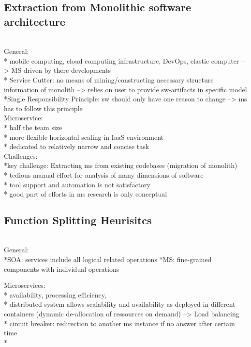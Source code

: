 \subsection{Extraction from Monolithic software architecture}
\cite{ExtractionMazlami} \\


General:\\
* mobile computing, cloud computing infrastructure, DevOps, elastic computer --> MS driven by there developments\\
* Service Cutter: no means of mining/constructing necessary structure information of monolith --> relies on user to provide sw-artifacts in specific model\\
*Single Responsibility Principle: sw should only have one reason to change --> ms has to follow this principle\\

Microservice:\\
* half the team size\\
* more flexible horizontal scaling in IaaS environment\\
* dedicated to relatively narrow and concise task\\


Challenges:\\
*key challenge: Extracting ms from existing codebases (migration of monolith)\\
* tedious manual effort for analysis of many dimensions of software\\
* tool support and automation is not satisfactory\\
* good part of efforts in ms research is only conceptual \\

\subsection{Function Splitting Heurisitcs}
\cite{HeuristicsAlwis} \\

General: \\
*SOA: services include all logical related operations
*MS: fine-grained components with individual operations


Microservices:\\
* availability, processing efficiency,\\
* distributed system allows scalability and availability as deployed in different containers (dynamic de-allocation of ressources on demand) --> Load balancing\\
* circuit breaker: redirection to another ms instance if no answer after certain time\\
* 

